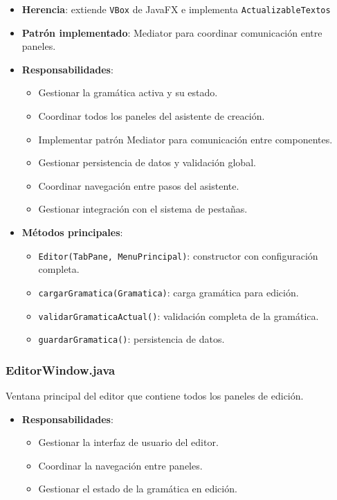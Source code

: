 \begin{itemize}
    \item \textbf{Herencia}: extiende \texttt{VBox} de JavaFX e implementa \texttt{ActualizableTextos}
    \item \textbf{Patrón implementado}: Mediator para coordinar comunicación entre paneles.
    \item \textbf{Responsabilidades}:
    \begin{itemize}
        \item Gestionar la gramática activa y su estado.
        \item Coordinar todos los paneles del asistente de creación.
        \item Implementar patrón Mediator para comunicación entre componentes.
        \item Gestionar persistencia de datos y validación global.
        \item Coordinar navegación entre pasos del asistente.
        \item Gestionar integración con el sistema de pestañas.
    \end{itemize}
    \item \textbf{Métodos principales}:
    \begin{itemize}
        \item \texttt{Editor(TabPane, MenuPrincipal)}: constructor con configuración completa.
        \item \texttt{cargarGramatica(Gramatica)}: carga gramática para edición.
        \item \texttt{validarGramaticaActual()}: validación completa de la gramática.
        \item \texttt{guardarGramatica()}: persistencia de datos.
    \end{itemize}
\end{itemize}

\subsubsection{EditorWindow.java}

Ventana principal del editor que contiene todos los paneles de edición.

\begin{itemize}
    \item \textbf{Responsabilidades}:
    \begin{itemize}
        \item Gestionar la interfaz de usuario del editor.
        \item Coordinar la navegación entre paneles.
        \item Gestionar el estado de la gramática en edición.
    \end{itemize}
\end{itemize}

